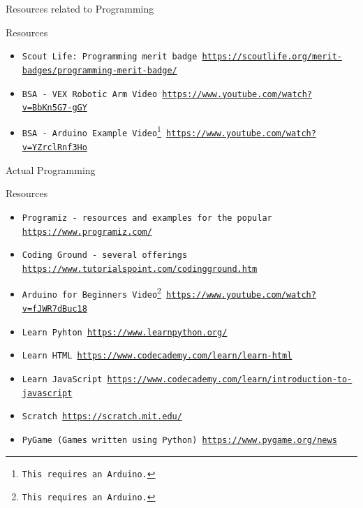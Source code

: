 \documentclass[10pt]{beamer}
\begin{document}
{%

\begin{frame}{Resources related to Programming}{}
\begin{block}{Resources}
  \begin{itemize}
    \item {\tt Scout Life: Programming merit badge \url{https://scoutlife.org/merit-badges/programming-merit-badge/}}
    \item {\tt BSA - VEX Robotic Arm Video \url{https://www.youtube.com/watch?v=BbKn5G7-gGY}}
    \item {\tt BSA - Arduino Example Video\footnote{\label{ard_rqd}This requires an Arduino.} \url{https://www.youtube.com/watch?v=YZrclRnf3Ho}}
    
    \end{itemize}
  \end{block}
\end{frame}


\begin{frame}{Actual Programming}{}
\begin{block}{Resources}
  \begin{itemize}
    \item {\tt Programiz - resources and examples for the popular \url{https://www.programiz.com/}}
    \item {\tt Coding Ground - several offerings \url{https://www.tutorialspoint.com/codingground.htm}}
    \item {\tt Arduino for Beginners Video\footnote{\label{ard_rqd}This requires an Arduino.} \url{https://www.youtube.com/watch?v=fJWR7dBuc18}}
    \item {\tt Learn Pyhton \url{https://www.learnpython.org/}}
    \item {\tt Learn HTML \url{https://www.codecademy.com/learn/learn-html}}
    \item {\tt Learn JavaScript \url{https://www.codecademy.com/learn/introduction-to-javascript}}
    \item {\tt Scratch \url{https://scratch.mit.edu/}}
    \item {\tt PyGame (Games written using Python) \url{https://www.pygame.org/news}}
    \end{itemize}
  \end{block}
\end{frame}

}
\end{document}

